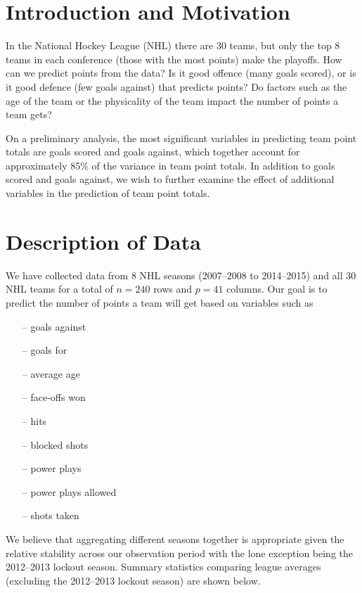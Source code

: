 \documentclass[12pt]{report}
\begin{document}


\section*{Introduction and Motivation}
 In the National Hockey League (NHL) there are 30 teams, but only the top 8 teams in each conference (those with the most points) make the playoffs. How can we predict points from the data? Is it good offence (many goals scored), or is it good defence (few goals against) that predicts points? Do factors such as the age of the team or the physicality of the team impact the number of points a team gets?

On a preliminary analysis, the most significant variables in predicting team point totals are goals scored and goals against, which together account for approximately 85\% of the variance in team point totals. In addition to goals scored and goals against, we wish to further examine the effect of additional variables in the prediction of team point totals.

\section*{Description of Data}

We have collected data from 8 NHL seasons (2007--2008 to 2014--2015) and all 30 NHL teams for a total of $n = 240$ rows and $p=41$ columns. Our goal is to predict the number of points a team will get based on variables such as

\begin{multicols}{3}
\begin{itemize}
\item[--] goals against
\item[--] goals for 
\item[--] average age 
\item[--] face-offs won
\item[--] hits
\item[--] blocked shots
\item[--] power plays
\item[--] power plays allowed
\item[--] shots taken
\end{itemize}
\end{multicols}

\medskip\noindent
We believe that aggregating different seasons together is appropriate given the relative stability across our observation period with the lone exception being the 2012--2013 lockout season. Summary statistics comparing league averages (excluding the 2012--2013 lockout season) are shown below.  
\end{document}
